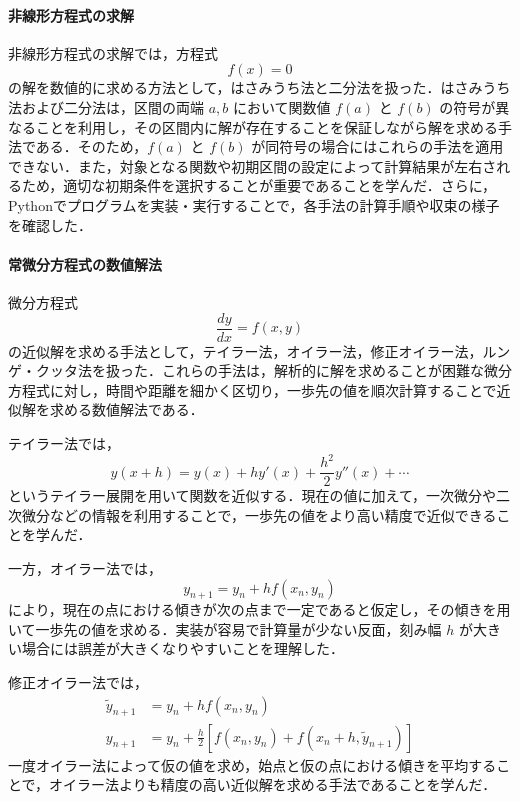 \paragraph{非線形方程式の求解}
非線形方程式の求解では，方程式
\begin{equation}
    f(x) = 0
\end{equation}
の解を数値的に求める方法として，はさみうち法と二分法を扱った．はさみうち法および二分法は，区間の両端 $a, b$ において関数値 $f(a)$ と $f(b)$ の符号が異なることを利用し，その区間内に解が存在することを保証しながら解を求める手法である．そのため，$f(a)$ と $f(b)$ が同符号の場合にはこれらの手法を適用できない．また，対象となる関数や初期区間の設定によって計算結果が左右されるため，適切な初期条件を選択することが重要であることを学んだ．さらに，Pythonでプログラムを実装・実行することで，各手法の計算手順や収束の様子を確認した．

\paragraph{常微分方程式の数値解法}
微分方程式
\begin{equation}
    \frac{dy}{dx} = f(x, y)
\end{equation}
の近似解を求める手法として，テイラー法，オイラー法，修正オイラー法，ルンゲ・クッタ法を扱った．これらの手法は，解析的に解を求めることが困難な微分方程式に対し，時間や距離を細かく区切り，一歩先の値を順次計算することで近似解を求める数値解法である．

テイラー法では，
\begin{equation}
    y(x+h) = y(x) + hy'(x) + \frac{h^2}{2}y''(x) + \cdots
\end{equation}
というテイラー展開を用いて関数を近似する．現在の値に加えて，一次微分や二次微分などの情報を利用することで，一歩先の値をより高い精度で近似できることを学んだ．

一方，オイラー法では，
\begin{equation}
    y_{n+1} = y_n + hf(x_n, y_n)
\end{equation}
により，現在の点における傾きが次の点まで一定であると仮定し，その傾きを用いて一歩先の値を求める．実装が容易で計算量が少ない反面，刻み幅 $h$ が大きい場合には誤差が大きくなりやすいことを理解した．

修正オイラー法では，
\begin{align}
    \tilde{y}_{n+1} &= y_n + hf(x_n, y_n) \\
    y_{n+1} &= y_n + \frac{h}{2} \left[ f(x_n, y_n) + f(x_n + h, \tilde{y}_{n+1}) \right]
\end{align}
一度オイラー法によって仮の値を求め，始点と仮の点における傾きを平均することで，オイラー法よりも精度の高い近似解を求める手法であることを学んだ．

